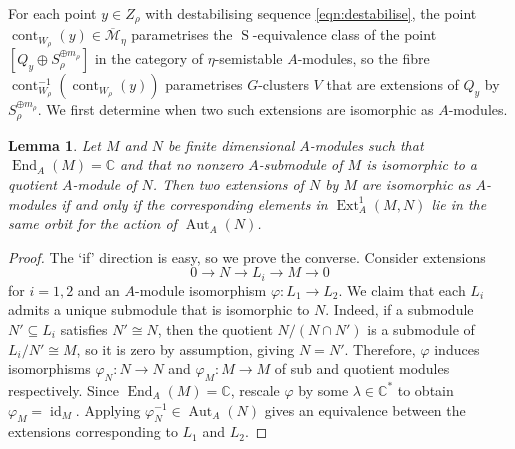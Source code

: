 \documentclass[11pt,reqno]{amsart}
\numberwithin{equation}{section}
\newtheorem{lemma}[theorem]{Lemma}
\theoremstyle{definition}
\newcommand{\CC}{\ensuremath{\mathbb{C}}}
\newcommand{\cont}{\operatorname{cont}}
\newcommand{\End}{\operatorname{End}}
\newcommand{\Ext}{\operatorname{Ext}}
\newcommand{\0}{\operatorname{0}}
\newcommand{\id}{\operatorname{id}}
\begin{document}
 For each point $y\in Z_\rho$ with destabilising sequence \eqref{eqn:destabilise},  the point $\cont_{W_\rho}(y)\in \overline{\mathcal{M}}_\eta$ parametrises the $\operatorname{S}$-equivalence class of the point $[Q_y\oplus S_\rho^{\oplus m_\rho}]$ in the category of $\eta$-semistable $A$-modules, so the fibre $\cont_{W_\rho}^{-1}(\cont_{W_\rho}(y))$ parametrises $G$-clusters $V$ that are extensions of $Q_y$ by $S_\rho^{\oplus m_\rho}$.  We first determine when two such extensions are isomorphic as $A$-modules.
 
\begin{lemma}
\label{lem:extIsom}
Let $M$ and $N$ be finite dimensional $A$-modules such that $\End_A(M)=\CC$ and that no nonzero $A$-submodule of $M$ is isomorphic to a quotient $A$-module of $N$. Then two extensions of $N$ by $M$ are isomorphic as $A$-modules if and only if the corresponding elements in $\Ext_A^1(M,N)$ lie in the same orbit for the action of $\operatorname{Aut}_A(N)$.
\end{lemma}
\begin{proof}
The `if' direction is easy, so we prove the converse. Consider extensions
\begin{equation}
0\longrightarrow N\longrightarrow L_i\longrightarrow M\longrightarrow 0
 \end{equation}
for $i=1, 2$ and an $A$-module isomorphism $\varphi\colon L_1\to L_2$. We claim that each $L_i$ admits a unique submodule that is isomorphic to $N$. Indeed, if a submodule $N'\subseteq L_i$ satisfies $N'\cong N$, then the quotient $N/(N\cap N')$ is a submodule of $L_i/N'\cong M$, so it is zero by assumption, giving $N=N'$. Therefore, $\varphi$ induces isomorphisms $\varphi_N\colon N\to N$ and $\varphi_M\colon M\to M$ of sub and quotient modules respectively. Since $\End_A(M)=\CC$, rescale $\varphi$ by some $\lambda\in \CC^*$ to obtain $\varphi_M=\id_M$. Applying $\varphi_N^{-1}\in \operatorname{Aut}_A(N)$ gives an equivalence between the extensions corresponding to $L_1$ and $L_2$.  
\end{proof}
   
\end{document}
